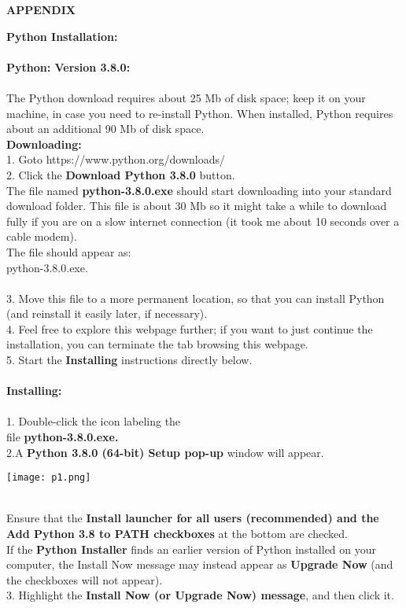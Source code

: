 \documentclass[12pt,a4paper]{report}
\begin{document}
\newpage
{}
\begin{center}
\textbf{\LARGE APPENDIX}
\end{center}
\large
\textbf{\LARGE Python Installation:}\\\\
\textbf{\Large Python: Version 3.8.0:}\\\\
The Python download requires about 25 Mb of disk space; keep it on your machine, in case you need to re-install Python. When installed, Python requires about an additional 90 Mb of disk space. \\
\textbf{\Large Downloading:}\\
1. Goto https://www.python.org/downloads/ \\
2. Click the \textbf{Download Python 3.8.0} button.\\
The file named \textbf{python-3.8.0.exe} should start downloading into your standard download folder. This file is about 30 Mb so it might take a while to download fully if you are on a slow internet connection (it took me about 10 seconds over a cable modem). \\
The file should appear as:\\

python-3.8.0.exe.\\\\
 3. Move this file to a more permanent location, so that you can install Python (and reinstall it easily later, if necessary).\\
4. Feel free to explore this webpage further; if you want to just continue the installation, you can terminate the tab browsing this webpage. \\
5. Start the \textbf{Installing} instructions directly below.\\\\
\textbf{\Large Installing:}\\\\
1. Double-click the icon labeling the\\ file \textbf{python-3.8.0.exe.}\\
2.A \textbf{Python 3.8.0 (64-bit) Setup pop-up} window will appear. \\

\begin{center}
\texttt{[image: p1.png]}
\end{center}\\
Ensure that the \textbf{Install launcher for all users (recommended) and the Add Python 3.8 to PATH checkboxes} at the bottom are checked. \\
If the \textbf{Python Installer} finds an earlier version of Python installed on your computer, the Install Now message may instead appear as \textbf{Upgrade Now} (and the checkboxes will not appear). \\
3. Highlight the \textbf{Install Now (or Upgrade Now) message}, and then click it.\\
\end{document}
